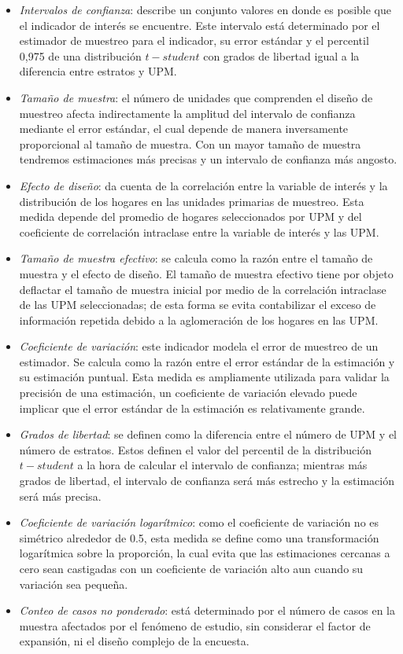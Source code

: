 \documentclass[12pt,spanish,]{book}
\providecommand{\tightlist}{%
  \setlength{\itemsep}{0pt}\setlength{\parskip}{0pt}}
\begin{document}
\begin{itemize}
\tightlist
\item
  \emph{Intervalos de confianza}: describe un conjunto valores en donde es posible que el indicador de interés se encuentre. Este intervalo está determinado por el estimador de muestreo para el indicador, su error estándar y el percentil 0,975 de una distribución \(t-student\) con grados de libertad igual a la diferencia entre estratos y UPM.
\item
  \emph{Tamaño de muestra}: el número de unidades que comprenden el diseño de muestreo afecta indirectamente la amplitud del intervalo de confianza mediante el error estándar, el cual depende de manera inversamente proporcional al tamaño de muestra. Con un mayor tamaño de muestra tendremos estimaciones más precisas y un intervalo de confianza más angosto.
\item
  \emph{Efecto de diseño}: da cuenta de la correlación entre la variable de interés y la distribución de los hogares en las unidades primarias de muestreo. Esta medida depende del promedio de hogares seleccionados por UPM y del coeficiente de correlación intraclase entre la variable de interés y las UPM.
\item
  \emph{Tamaño de muestra efectivo}: se calcula como la razón entre el tamaño de muestra y el efecto de diseño. El tamaño de muestra efectivo tiene por objeto deflactar el tamaño de muestra inicial por medio de la correlación intraclase de las UPM seleccionadas; de esta forma se evita contabilizar el exceso de información repetida debido a la aglomeración de los hogares en las UPM.
\item
  \emph{Coeficiente de variación}: este indicador modela el error de muestreo de un estimador. Se calcula como la razón entre el error estándar de la estimación y su estimación puntual. Esta medida es ampliamente utilizada para validar la precisión de una estimación, un coeficiente de variación elevado puede implicar que el error estándar de la estimación es relativamente grande.
\item
  \emph{Grados de libertad}: se definen como la diferencia entre el número de UPM y el número de estratos. Estos definen el valor del percentil de la distribución \(t-student\) a la hora de calcular el intervalo de confianza; mientras más grados de libertad, el intervalo de confianza será más estrecho y la estimación será más precisa.
\item
  \emph{Coeficiente de variación logarítmico}: como el coeficiente de variación no es simétrico alrededor de 0.5, esta medida se define como una transformación logarítmica sobre la proporción, la cual evita que las estimaciones cercanas a cero sean castigadas con un coeficiente de variación alto aun cuando su variación sea pequeña.
\item
  \emph{Conteo de casos no ponderado}: está determinado por el número de casos en la muestra afectados por el fenómeno de estudio, sin considerar el factor de expansión, ni el diseño complejo de la encuesta.
\end{itemize}
\end{document}
